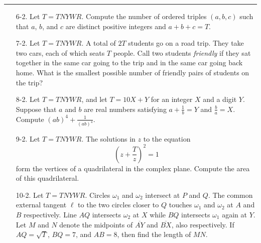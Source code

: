 \documentclass[10pt]{article}
\begin{document}
\begin{center}
\noindent\rule{0.5\textwidth}{0.4pt}
\end{center}

\begin{enumerate}

\item[6-2.] Let $T = TNYWR$. Compute the number of ordered triples $(a,b,c)$ such that $a$, $b$, and $c$ are distinct positive integers and $a + b + c = T$.

\item[7-2.] Let $T = TNYWR$. A total of $2T$ students go on a road trip. They take two cars, each of which seats $T$ people. Call two students \textit{friendly} if they sat together in the same car going to the trip and in the same car going back home. What is the smallest possible number of friendly pairs of students on the trip?

\item[8-2.] Let $T = TNYWR$, and let $T = 10X + Y$ for an integer $X$ and a digit $Y$. Suppose that $a$ and $b$ are real numbers satisfying $a+\frac1b=Y$ and $\frac{b}a=X$. Compute $(ab)^4+\frac1{(ab)^4}$.

\item[9-2.] Let $T = TNYWR$. The solutions in $z$ to the equation \[\left(z + \frac Tz\right)^2 = 1\] form the vertices of a quadrilateral in the complex plane.  Compute the area of this quadrilateral.

\item[10-2.] Let $T = TNYWR$. Circles $\omega_1$ and $\omega_2$ intersect at $P$ and $Q$.  The common external tangent $\ell$ to the two circles closer to $Q$ touches $\omega_1$ and $\omega_2$ at $A$ and $B$ respectively.  Line $AQ$ intersects $\omega_2$ at $X$ while $BQ$ intersects $\omega_1$ again at $Y$.  Let $M$ and $N$ denote the midpoints of $\overline{AY}$ and $\overline{BX}$, also respectively.  If $AQ=\sqrt{T}$, $BQ=7$, and $AB=8$, then find the length of $MN$.

\end{enumerate}
\end{document}
